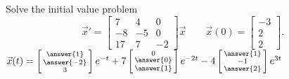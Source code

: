 \documentclass{ximera}
\begin{document}
\begin{exercise}
    Solve the initial value problem
    \[ 
        {\vec{x}}' = 
        \begin{bmatrix} 
            7 & 4 & 0 \\ 
            -8 & -5 & 0 \\ 
            17 & 7 & -2 
        \end{bmatrix} 
        \vec{x} \qquad \vec{x}(0) = 
        \begin{bmatrix} 
            -3 \\ 
            2 \\ 
            2 
        \end{bmatrix}. 
    \]
    $\vec{x}(t) = \left[\begin{smallmatrix} \answer{1} \\ \answer{-2} \\ 3 \end{smallmatrix}\right]e^{-t} + 7\left[\begin{smallmatrix} 0 \\ \answer{0} \\ \answer{1} \end{smallmatrix}\right]e^{-2t} - 4\left[\begin{smallmatrix} \answer{1} \\ -1 \\ \answer{2} \end{smallmatrix}\right]e^{3t}$
\end{exercise}
\end{document}
